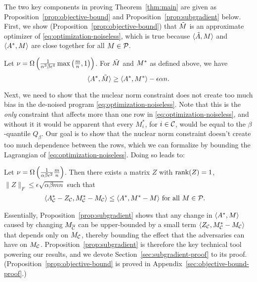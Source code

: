 The two key components in proving Theorem~\ref{thm:main} are 
given as Proposition~\ref{prop:objective-bound} and 
Proposition~\ref{prop:subgradient} below. First, we show 
(Proposition~\ref{prop:objective-bound}) that $\tilde{M}$ is an approximate optimizer 
of \ref{eq:optimization-noiseless}, which is true because 
$\langle \tilde{A}, M \rangle$ and $\langle A^*, M \rangle$ are close together for 
all $M \in \mathcal{P}$.
\begin{proposition}
\label{prop:objective-bound}
Let $\nu = \Omega\left( \frac{1}{\alpha^3\beta\epsilon^4}\max\left( \frac{m}{n},1 \right) \right)$. For $\tilde{M}$ and $M^*$ as defined above, we have
\begin{equation}
\label{eq:objective-bound}
\langle A^*, \tilde{M} \rangle \geq \langle A^*, M^* \rangle - \epsilon \alpha n.
\end{equation}
\end{proposition}

Next, we need to show that the nuclear norm constraint does 
not create too much bias in the de-noised program 
\eqref{eq:optimization-noiseless}. Note that this is the \emph{only} constraint 
that affects more than one row in \eqref{eq:optimization-noiseless}, and without 
it it would be apparent that every $M^*_i$, for $i \in \mathcal{C}$, would be equal to the 
$\beta$-quantile $Q_{\beta}$. Our goal is to show that the nuclear norm 
constraint doesn't create too much dependence between the rows, which we can 
formalize by bounding the Lagrangian of \eqref{eq:optimization-noiseless}. 
Doing so leads to:

\begin{proposition}
\label{prop:subgradient}
Let $\nu = \Omega\left( \frac{1}{\alpha\beta\epsilon^2}\frac{m}{n} \right)$. Then there exists a matrix $Z$ with 
$\operatorname{rank}(Z) = 1$, $\|Z\|_F \leq \epsilon \sqrt{\alpha\beta mn}$ such that
\begin{align}
\langle A^*_{\mathcal{C}} - Z_{\mathcal{C}}, M^*_{\mathcal{C}} - M_{\mathcal{C}} \rangle &\leq \langle A^*, M^* - M \rangle \text{ for all $M \in \mathcal{P}$}.
\end{align}
\end{proposition}
Essentially, Proposition~\ref{prop:subgradient} shows that any change in 
$\langle A^*, M \rangle$ caused by changing $M_{\overline{\mathcal{C}}}$ can be upper-bounded 
by a small term $\langle Z_{\mathcal{C}}, M^*_{\mathcal{C}} - M_{\mathcal{C}} \rangle$ that depends only 
on $M_{\mathcal{C}}$, thereby bounding the effect that the adversaries can have 
on $M_{\mathcal{C}}$. Proposition~\ref{prop:subgradient} is therefore the key 
technical tool powering our results, and we devote 
Section~\ref{sec:subgradient-proof} to its proof. (Proposition~\ref{prop:objective-bound} is proved in Appendix~\ref{sec:objective-bound-proof}.)

